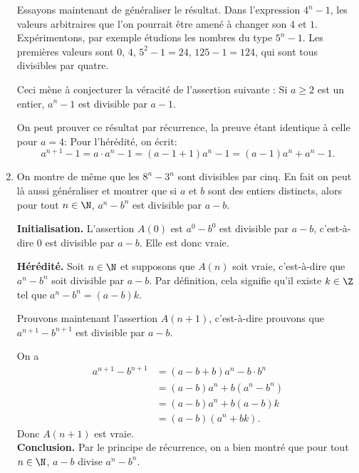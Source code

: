 \begin{Soln}{30}
\begin{enumerate}
Essayons maintenant de généraliser le résultat. Dans l'expression $4^n-1$, les valeurs arbitraires que l'on pourrait être amené à changer son $4$ et $1$. Expérimentons, par exemple étudions les nombres du type $5^n-1$. Les premières valeurs sont $0$, $4$, $5^2-1=24$, $125-1=124$, qui sont tous divisibles par quatre.

Ceci mène à conjecturer la véracité de l'assertion suivante : \og Si $a\geq 2$ est un entier, $a^n-1$ est divisible par $a-1$.\fg

On peut prouver ce résultat par récurrence, la preuve étant identique à celle pour $a=4$: Pour l'hérédité, on écrit:
\[ a^{n+1}-1 = a\cdot a^n-1 = (a-1+1)a^n-1= (a-1)a^n + a^n-1.\]

\item On montre de même que les $8^n-3^n$ sont divisibles par cinq. En fait on peut là aussi généraliser et montrer que si $a$ et $b$ sont des entiers distincts, alors pour tout $n\in \N$, $a^n-b^n$ est divisible par $a-b$.

\textbf{Initialisation.} L'assertion $A(0)$ est \og $a^0-b^0$ est divisible par $a-b$\fg, c'est-à-dire \og $0$ est divisible par $a-b$\fg. Elle est donc vraie.

\textbf{Hérédité.} Soit $n\in \N$ et supposons que $A(n)$ soit vraie, c'est-à-dire que $a^n-b^n$ soit divisible par $a-b$. Par définition, cela signifie qu'il existe $k\in\Z$ tel que $a^n-b^n=(a-b)k$.

Prouvons maintenant l'assertion $A(n+1)$, c'est-à-dire prouvons que $a^{n+1}-b^{n+1}$ est divisible par $a-b$.

On a
\begin{align*}
a^{n+1}-b^{n+1} &= (a-b+b)a^n-b\cdot b^n\\
		  &= (a-b)a^n + b(a^n-b^n)\\
		  &= (a-b)a^n + b(a-b)k\\
		  &= (a-b)(a^n+bk).
\end{align*}
Donc $A(n+1)$ est vraie.\\
\textbf{Conclusion.} Par le principe de récurrence, on a bien montré que pour tout $n\in \N$, $a-b$ divise $a^{n}-b^{n}$.

\end{enumerate}


\end{Soln}
